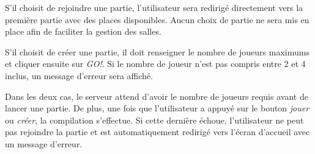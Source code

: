 S'il choisit de rejoindre une partie, l'utilisateur sera redirigé directement vers la première partie avec des places disponibles. Aucun choix de partie ne sera mis en place afin de faciliter la gestion des salles.

S'il choisit de créer une partie, il doit renseigner le nombre de joueurs maximums et cliquer ensuite sur \textit{GO!}. Si le nombre de joueur n'est pas compris entre 2 et 4 inclus, un message d'erreur sera affiché.

Dans les deux cas, le serveur attend d'avoir le nombre de joueurs requis avant de lancer une partie. De plus, une fois que l'utilisateur a appuyé sur le bouton \textit{jouer} ou \textit{créer}, la compilation s'effectue. Si cette dernière échoue, l'utilisateur ne peut pas rejoindre la partie et est automatiquement redirigé vers l'écran d'accueil avec un message d'erreur.

